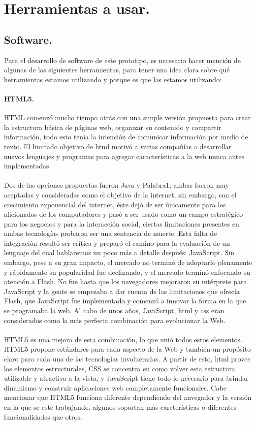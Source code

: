 \documentclass[12pt, a4paper, titlepage]{report}
\begin{document}
    	\section{Herramientas a usar.}
			\subsection{Software.}
			Para el desarrollo de software de este prototipo, es necesario hacer mención de algunas de las siguientes herramientas, para tener una idea clara sobre qué herramientas estamos utilizando y porque es que las estamos utilizando:
			
			\paragraph{HTML5.}
			HTML comenzó mucho tiempo atrás con una simple versión propuesta para crear la estructura básica de páginas web, organizar su contenido y compartir información, todo esto tenía la intención de comunicar información por medio de texto. El limitado objetivo de html motivó a varias compañías a desarrollar nuevos lenguajes y programas para agregar características a la web nunca antes implementadas.   \\\\
			Dos de las opciones propuestas fueron Java y \Gls{Palabra1}; ambas fueron muy aceptadas y consideradas como el objetivo de la internet, sin embargo, con el crecimiento exponencial del internet, éste dejó de ser únicamente para los aficionados de los computadores y pasó a ser usado como un campo estratégico para los negocios y para la interacción social, ciertas limitaciones presentes en ambas tecnologías probaron ser una sentencia de muerte. Esta falta de integración resultó ser crítica y preparó el camino para la evaluación de un lenguaje del cual hablaremos un poco más a detalle después: JavaScript. Sin embargo, pese a su gran impacto, el mercado no terminó de adoptarlo plenamente y rápidamente su popularidad fue declinando, y el mercado terminó enfocando su atención a Flash. No fue hasta que los navegadores mejoraron su intérprete para JavaScript y la gente se empezaba a dar cuenta de las limitaciones que ofrecía Flash, que JavaScript fue implementado y comenzó a innovar la forma en la que se programaba la web. Al cabo de unos años, JavaScript, html y css eran considerados como la más perfecta combinación para evolucionar la Web. \\\\
			HTML5 es una mejora de esta combinación, lo que unió todos estos elementos. HTML5 propone estándares para cada aspecto de la Web y también un propósito claro para cada una de las tecnologías involucradas. A partir de esto, html provee los elementos estructurales, CSS se concentra en como volver esta estructura utilizable y atractiva a la vista, y JavaScript tiene todo lo necesario para brindar dinamismo y construir aplicaciones web completamente funcionales. Cabe mencionar que HTML5 funciona diferente dependiendo del navegador y la versión en la que se esté trabajando, algunos soportan más carcterísticas o diferentes funcionalidades que otros.
			
\end{document}
